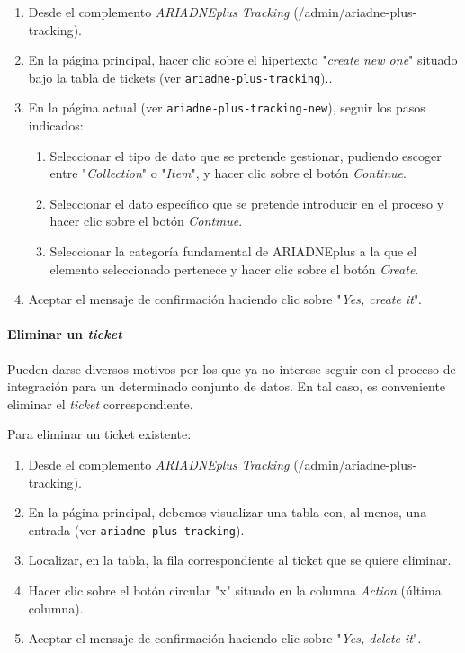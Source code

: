 \documentclass[
]{article}
\providecommand{\tightlist}{%
  \setlength{\itemsep}{0pt}\setlength{\parskip}{0pt}}
\begin{document}
\begin{enumerate}
\def\labelenumi{\arabic{enumi}.}
\tightlist
\item
  Desde el complemento \emph{ARIADNEplus Tracking}
  ({/admin/ariadne-plus-tracking}).
\item
  En la página principal, hacer clic sobre el hipertexto "\emph{create
  new one}" situado bajo la tabla de tickets (ver
  \texttt{ariadne-plus-tracking})..
\item
  En la página actual (ver \texttt{ariadne-plus-tracking-new}), seguir
  los pasos indicados:

  \begin{enumerate}
  \def\labelenumii{\alph{enumii}.}
  \tightlist
  \item
    Seleccionar el tipo de dato que se pretende gestionar, pudiendo
    escoger entre "\emph{Collection}" o "\emph{Item}", y hacer clic
    sobre el botón \emph{Continue}.
  \item
    Seleccionar el dato específico que se pretende introducir en el
    proceso y hacer clic sobre el botón \emph{Continue}.
  \item
    Seleccionar la categoría fundamental de ARIADNEplus a la que el
    elemento seleccionado pertenece y hacer clic sobre el botón
    \emph{Create}.
  \end{enumerate}
\item
  Aceptar el mensaje de confirmación haciendo clic sobre "\emph{Yes,
  create it}".
\end{enumerate}

\hypertarget{eliminar-un-ticket}{%
\paragraph{\texorpdfstring{Eliminar un
\emph{ticket}}{Eliminar un ticket}}\label{eliminar-un-ticket}}

Pueden darse diversos motivos por los que ya no interese seguir con el
proceso de integración para un determinado conjunto de datos. En tal
caso, es conveniente eliminar el \emph{ticket} correspondiente.

Para eliminar un ticket existente:

\begin{enumerate}
\def\labelenumi{\arabic{enumi}.}
\tightlist
\item
  Desde el complemento \emph{ARIADNEplus Tracking}
  ({/admin/ariadne-plus-tracking}).
\item
  En la página principal, debemos visualizar una tabla con, al menos,
  una entrada (ver \texttt{ariadne-plus-tracking}).
\item
  Localizar, en la tabla, la fila correspondiente al ticket que se
  quiere eliminar.
\item
  Hacer clic sobre el botón circular "x" situado en la columna
  \emph{Action} (última columna).
\item
  Aceptar el mensaje de confirmación haciendo clic sobre "\emph{Yes,
  delete it}".
\end{enumerate}
\end{document}
